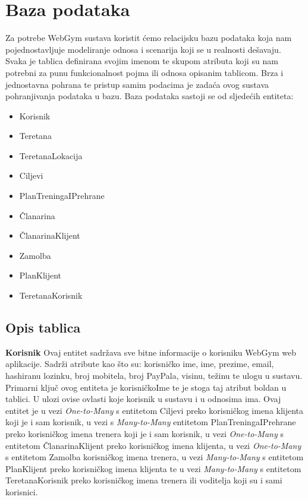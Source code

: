 	
		\section{Baza podataka}
		Za potrebe WebGym sustava koristit ćemo relacijsku bazu podataka koja nam pojednostavljuje modeliranje odnosa i scenarija koji se u realnosti dešavaju. Svaka je tablica definirana svojim imenom te skupom atributa koji su nam potrebni za punu funkcionalnost pojma ili odnosa opisanim tablicom. Brza i jednostavna pohrana te pristup samim podacima je zadaća ovog sustava pohranjivanja podataka u bazu. Baza podataka sastoji se od sljedećih entiteta:
		\begin{itemize}
	        	\item 	Korisnik
	        	\item 	Teretana 
	        	\item 	TeretanaLokacija 
	        	\item   Ciljevi
	        	\item 	PlanTreningaIPrehrane
	        	\item 	Članarina
	        	\item 	ČlanarinaKlijent
	        	\item 	Zamolba
	        	\item   PlanKlijent
	        	\item   TeretanaKorisnik
        	\end{itemize}
		
		
		\subsection{Opis tablica}
		\textbf{Korisnik} Ovaj entitet sadržava sve bitne informacije o korisniku WebGym web aplikacije. Sadrži atribute kao što su: korisničko ime, ime, prezime, email, hashiranu lozinku, broj mobitela, broj PayPala, visinu, težinu te ulogu u sustavu. Primarni ključ ovog entiteta je korisničkoIme te je stoga taj atribut boldan u tablici. U ulozi ovise ovlasti koje korisnik u sustavu i u odnosima ima. Ovaj entitet je u vezi \emph{One-to-Many} s entitetom Ciljevi preko korisničkog imena klijenta koji je i sam korisnik, u vezi s \emph{Many-to-Many} entitetom PlanTreningaIPrehrane preko korisničkog imena trenera koji je i sam korisnik, u vezi \emph{One-to-Many} s entitetom ČlanarinaKlijent preko korisničkog imena klijenta, u vezi \emph{One-to-Many} s entitetom  Zamolba korisničkog imena trenera, u vezi \emph{Many-to-Many} s entitetom PlanKlijent preko korisničkog imena klijenta te u vezi \emph{Many-to-Many} s entitetom TeretanaKorisnik preko korisničkog imena trenera ili voditelja koji su i sami korisnici.
				
